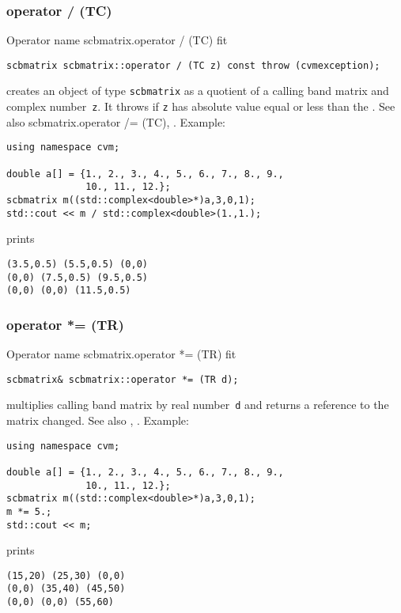 \subsubsection{operator / (TC)}
Operator%
\pdfdest name {scbmatrix.operator / (TC)} fit
\begin{verbatim}
scbmatrix scbmatrix::operator / (TC z) const throw (cvmexception);
\end{verbatim}
creates an object of type \verb"scbmatrix" as a quotient of
a calling band matrix and  complex number~\verb"z". 
It throws
if \verb"z" has  absolute value equal or less than the
.
See also 
{scbmatrix.operator /= (TC)},
.
Example:
\begin{Verbatim}
using namespace cvm;

double a[] = {1., 2., 3., 4., 5., 6., 7., 8., 9.,
              10., 11., 12.};
scbmatrix m((std::complex<double>*)a,3,0,1);
std::cout << m / std::complex<double>(1.,1.);
\end{Verbatim}
prints
\begin{Verbatim}
(3.5,0.5) (5.5,0.5) (0,0)
(0,0) (7.5,0.5) (9.5,0.5)
(0,0) (0,0) (11.5,0.5)
\end{Verbatim}
\newpage



\subsubsection{operator *= (TR)}
Operator%
\pdfdest name {scbmatrix.operator *= (TR)} fit
\begin{verbatim}
scbmatrix& scbmatrix::operator *= (TR d);
\end{verbatim}
multiplies  calling band matrix by  real number~\verb"d"
and returns a reference to
the matrix changed.
See also ,
.
Example:
\begin{Verbatim}
using namespace cvm;

double a[] = {1., 2., 3., 4., 5., 6., 7., 8., 9.,
              10., 11., 12.};
scbmatrix m((std::complex<double>*)a,3,0,1);
m *= 5.;
std::cout << m;
\end{Verbatim}
prints
\begin{Verbatim}
(15,20) (25,30) (0,0)
(0,0) (35,40) (45,50)
(0,0) (0,0) (55,60)
\end{Verbatim}
\newpage



